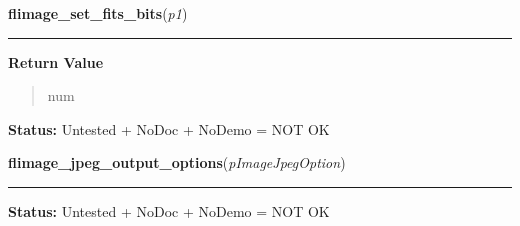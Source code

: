     \label{xformslib:flflimage:flimage_set_fits_bits}

    \vspace{0.5ex}

\hspace{.8\funcindent}\begin{boxedminipage}{\funcwidth}

    \raggedright \textbf{flimage\_set\_fits\_bits}(\textit{p1})

    \vspace{-1.5ex}

    \rule{\textwidth}{0.5\fboxrule}
\setlength{\parskip}{2ex}
\setlength{\parskip}{1ex}
      \textbf{Return Value}
    \vspace{-1ex}

      \begin{quote}
      num

      \end{quote}

\textbf{Status:} Untested + NoDoc + NoDemo = NOT OK



    \end{boxedminipage}

    \label{xformslib:flflimage:flimage_jpeg_output_options}

    \vspace{0.5ex}

\hspace{.8\funcindent}\begin{boxedminipage}{\funcwidth}

    \raggedright \textbf{flimage\_jpeg\_output\_options}(\textit{pImageJpegOption})

    \vspace{-1.5ex}

    \rule{\textwidth}{0.5\fboxrule}
\setlength{\parskip}{2ex}
\setlength{\parskip}{1ex}
\textbf{Status:} Untested + NoDoc + NoDemo = NOT OK



    \end{boxedminipage}

    \label{xformslib:flflimage:flimage_pnm_output_options}

